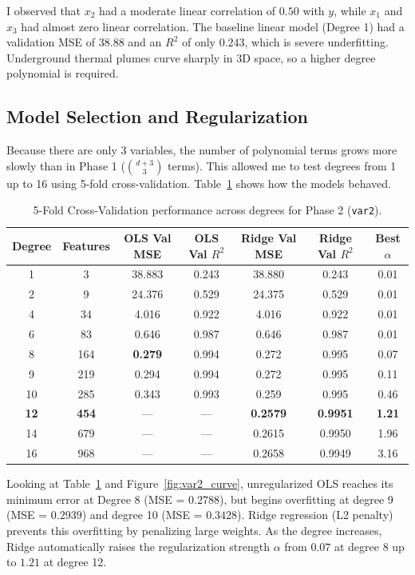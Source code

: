 \documentclass[11pt,a4paper]{article}
\begin{document}
I observed that $x_2$ had a moderate linear correlation of $0.50$ with $y$, while $x_1$ and $x_3$ had almost zero linear correlation. The baseline linear model (Degree 1) had a validation MSE of $38.88$ and an $R^2$ of only $0.243$, which is severe underfitting. Underground thermal plumes curve sharply in 3D space, so a higher degree polynomial is required.

\subsection{Model Selection and Regularization}
Because there are only 3 variables, the number of polynomial terms grows more slowly than in Phase 1 ($\binom{d+3}{3}$ terms). This allowed me to test degrees from 1 up to 16 using 5-fold cross-validation. Table~\ref{tab:var2} shows how the models behaved.

\begin{table}[htbp]
\centering
\small
\setlength{\tabcolsep}{5pt}
\caption{5-Fold Cross-Validation performance across degrees for Phase 2 (\texttt{var2}).}
\label{tab:var2}
\begin{tabular}{ccccccc}
\toprule
Degree & Features & OLS Val MSE & OLS Val $R^2$ & Ridge Val MSE & Ridge Val $R^2$ & Best $\alpha$ \\
\midrule
1  & 3   & 38.883 & 0.243 & 38.880 & 0.243 & 0.01 \\
2  & 9   & 24.376 & 0.529 & 24.375 & 0.529 & 0.01 \\
4  & 34  & 4.016  & 0.922 & 4.016  & 0.922 & 0.01 \\
6  & 83  & 0.646  & 0.987 & 0.646  & 0.987 & 0.01 \\
8  & 164 & \textbf{0.279} & 0.994 & 0.272  & 0.995 & 0.07 \\
9  & 219 & 0.294  & 0.994 & 0.272  & 0.995 & 0.11 \\
10 & 285 & 0.343  & 0.993 & 0.259  & 0.995 & 0.46 \\
\textbf{12} & \textbf{454} & --- & --- & \textbf{0.2579} & \textbf{0.9951} & \textbf{1.21} \\
14 & 679 & ---    & ---   & 0.2615 & 0.9950 & 1.96 \\
16 & 968 & ---    & ---   & 0.2658 & 0.9949 & 3.16 \\
\bottomrule
\end{tabular}
\end{table}

Looking at Table~\ref{tab:var2} and Figure~\ref{fig:var2_curve}, unregularized OLS reaches its minimum error at Degree 8 (MSE = $0.2788$), but begins overfitting at degree 9 (MSE = $0.2939$) and degree 10 (MSE = $0.3428$). Ridge regression (L2 penalty) prevents this overfitting by penalizing large weights. As the degree increases, Ridge automatically raises the regularization strength $\alpha$ from $0.07$ at degree 8 up to $1.21$ at degree 12.
\end{document}
